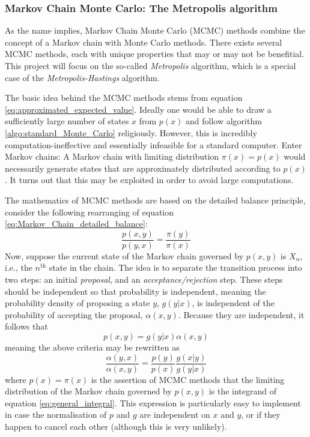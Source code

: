 \documentclass[nofootinbib,reprint,english]{revtex4-1}
\begin{document}
\subsubsection{Markov Chain Monte Carlo: The Metropolis algorithm}
As the name implies, Markov Chain Monte Carlo (MCMC) methods combine the concept of a Markov chain with Monte Carlo methods. There exists several MCMC methods, each with unique properties that may or may not be benefitial. This project will focus on the so-called \emph{Metropolis} algorithm, which is a special case of the \emph{Metropolis-Hastings} algorithm.

The basic idea behind the MCMC methods stems from equation \eqref{eq:approximated_expected_value}. Ideally one would be able to draw a sufficiently large number of states \(x\) from \(p(x)\) and follow algorithm \ref{algo:standard_Monte_Carlo} religiously. However, this is incredibly computation-ineffective and essentially infeasible for a standard computer. Enter Markov chains: A Markov chain with limiting distribution \(\pi(x)=p(x)\) would necessarily generate states that are approximately distributed according to \(p(x)\). It turns out that this may be exploited in order to avoid large computations.

The mathematics of MCMC methods are based on the detailed balance principle, consider the following rearranging of equation \eqref{eq:Markov_Chain_detailed_balance}:
\[\frac{p(x,y)}{p(y,x)}=\frac{\pi(y)}{\pi(x)}\]
Now, suppose the current state of the Markov chain governed by \(p(x,y)\) is \(X_n\), i.e., the \(n^\text{th}\) state in the chain. The idea is to separate the transition process into two steps: an initial \emph{proposal}, and an \emph{acceptance/rejection} step. These steps should be independent so that probability is independent, meaning the probability density of proposing a state \(y\), \(g(y|x)\), is independent of the probability of accepting the proposal, \(\alpha(x,y)\). Because they are independent, it follows that
\begin{equation}
p(x,y)=g(y|x)\alpha(x,y)
\end{equation}
meaning the above criteria may be rewritten as
\begin{equation}\label{eq:MCMC_detailed_balance_with_TandA}
\frac{\alpha(y,x)}{\alpha(x,y)}=\frac{p(y)}{p(x)}\frac{g(x|y)}{g(y|x)}
\end{equation}
where \(p(x)=\pi(x)\) is the assertion of MCMC methods that the limiting distribution of the Markov chain governed by \(p(x,y)\) is the integrand of equation \eqref{eq:general_integral}. This expression is particularly easy to implement in case the normalisation of \(p\) and \(g\) are independent on \(x\) and \(y\), or if they happen to cancel each other (although this is very unlikely).
\end{document}
